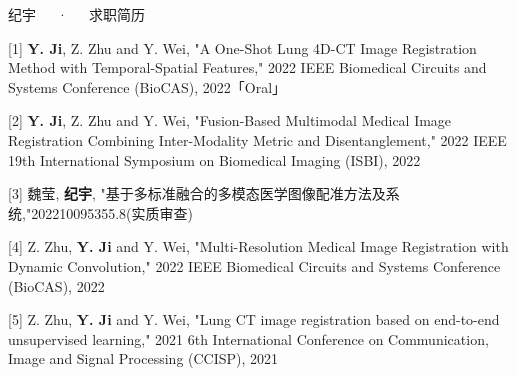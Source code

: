 \documentclass[11pt, a4paper,AutoFakeBold]{awesome-cv}
\begin{document}
\makecvheader

\makecvfooter
  {}
  {纪宇~~~·~~~求职简历}
  {\thepage}






% 
\newpage

% 
% 
% 

[1] \textbf{Y. Ji}, Z. Zhu and Y. Wei, "A One-Shot Lung 4D-CT Image Registration Method with Temporal-Spatial Features," 2022 IEEE Biomedical Circuits and Systems Conference (BioCAS), 2022「Oral」

[2] \textbf{Y. Ji}, Z. Zhu and Y. Wei, "Fusion-Based Multimodal Medical Image Registration Combining Inter-Modality Metric and Disentanglement," 2022 IEEE 19th International Symposium on Biomedical Imaging (ISBI), 2022

[3] 魏莹, \textbf{纪宇}, "基于多标准融合的多模态医学图像配准方法及系统,"202210095355.8(实质审查)

[4] Z. Zhu, \textbf{Y. Ji} and Y. Wei, "Multi-Resolution Medical Image Registration with Dynamic Convolution," 2022 IEEE Biomedical Circuits and Systems Conference (BioCAS), 2022

[5] Z. Zhu, \textbf{Y. Ji} and Y. Wei, "Lung CT image registration based on end-to-end unsupervised learning," 2021 6th International Conference on Communication, Image and Signal Processing (CCISP), 2021
\end{document}
